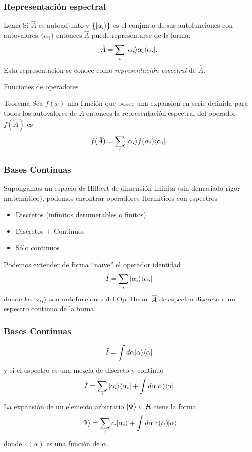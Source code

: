 \documentclass{beamer}
\begin{document}
\begin{frame}
    \frametitle{Representación espectral}
    \begin{block}{Lema}
        Si $\hat{A}$ es autoadjunto y $\{| \alpha_i \rangle\}$ es el conjunto de sus autofunciones con autovalores $\{\alpha_i\}$ entonces $\hat{A}$ puede representarse de la forma:
        \[ \hat{A} = \sum_{i} | \alpha_i \rangle\alpha_i \langle \alpha_i |.\]
        Esta representación se conoce como {\em representación espectral} de $\hat{A}$.
    \end{block}


\end{frame} 

\begin{frame}{Funciones de operadores}
    
    \begin{block}{Teorema}
        Sea $f(x)$ una función que posee una expansión en serie definida para todos los autovalores de $\hat{A}$ entonces la representación espectral del operador $f(\hat{A})$ es
        \[ f(\hat{A}) = \sum_{i} | \alpha_i \rangle f(\alpha_i) \langle \alpha_i |. \]
    \end{block}

\end{frame}

\begin{frame}
    \frametitle{Bases Continuas}
    Supongamos un espacio de Hilbert de dimensión infinita (sin demasiado rigor matemático), podemos encontrar operadores Hermíticos con espectros
    \begin{itemize}
        \item Discretos (infinitos denumerables o finitos)
        \item Discretos $+$ Continuos
        \item Sólo continuos
    \end{itemize}
    Podemos extender de forma ``naïve'' el operador identidad
    $$\hat{I}=\sum_i| \alpha_i \rangle\langle \alpha_i |$$
    donde las $| \alpha_i \rangle$ son autofunciones del Op. Herm. $\hat{A}$ de espectro discreto a un espectro continuo de la forma
\end{frame}

\begin{frame}
    \frametitle{Bases Continuas}
    $$\hat{I}=\int d\alpha | \alpha \rangle\langle \alpha |$$
    y si el espectro es una mezcla de discreto y continuo
    $$\hat{I}=\sum_i| \alpha_i \rangle\langle \alpha_i |+\int d\alpha | \alpha \rangle\langle \alpha |$$
    La expansión de un elemento arbitrario $| \Psi \rangle\in\mathcal{H}$ tiene la forma
    $$| \Psi \rangle=\sum_i c_i | \alpha_i \rangle + \int d\alpha\  c(\alpha)| \alpha \rangle$$
    donde $c(\alpha)$ es una función de $\alpha$.
\end{frame}
\end{document}
